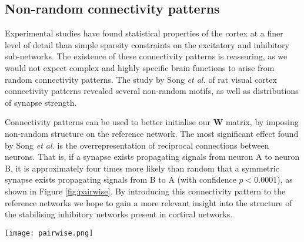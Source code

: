 \documentclass[12pt, a4paper]{article}
\begin{document}
\FloatBarrier
\subsection{Non-random connectivity patterns}
\label{sec:symPats}
Experimental studies have found statistical properties of the cortex at a finer level of detail than simple sparsity constraints on the excitatory and inhibitory sub-networks\cite{Milo2002}.  The existence of these connectivity patterns is reassuring, as we would not expect complex and highly specific brain functions to arise from random connectivity patterns.  The study by Song \emph{et al.} \cite{Song2005} of rat visual cortex connectivity patterns revealed several non-random motifs, as well as distributions of synapse strength. 

Connectivity patterns can be used to better initialise our $\mathbf{W}$ matrix, by imposing non-random structure on the reference network. The most significant effect found by Song \emph{et al.} is the overrepresentation of reciprocal connections between neurons.  That is, if a synapse exists propagating signals from neuron A to neuron B, it is approximately four times more likely than random that a symmetric synapse exists propagating signals from B to A (with confidence $p < 0.0001$), as shown in Figure \ref{fig:pairwise}.  By introducing this connectivity pattern to the reference networks we hope to gain a more relevant insight into the structure of the stabilising inhibitory networks present in cortical networks. 


\begin{SCfigure}
    \centering
    \texttt{[image: pairwise.png]}  
    \caption{Analysis of cortical networks in rats showing the overrepresentation of bidirectional connectivity patterns.\\  \textbf{A} The calculation of the null hypothesis probability of bidirectional connections, calculated assuming independence of connections.\\  \textbf{B} Measured numbers of bidirectional connections are four times higher than predicted by a random network. \\(Figure adapted from Song \emph{et al.} (2005).)}
    \label{fig:pairwise}
\end{SCfigure}




\pagebreak
\FloatBarrier
\end{document}
